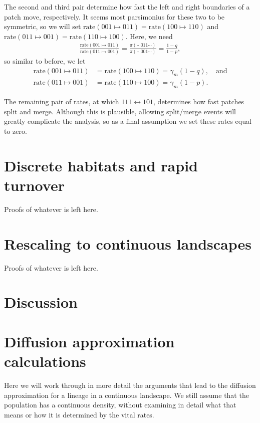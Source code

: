 \documentclass{article}
\newcommand{\rate}[2]{\text{rate}(#1\mapsto#2)}
\begin{document}
The second and third pair determine how fast the left and right boundaries of a patch move, respectively.
It seems most parsimonius for these two to be symmetric,
so we will set $\rate{001}{011} = \rate{100}{110}$ and $\rate{011}{001} = \rate{110}{100}$.
Here, we need
\begin{align*}
    \frac{\rate{001}{011}}{\rate{011}{001}}
    =
    \frac{\pi(\cdots011\cdots)}{\pi(\cdots001\cdots)}
    =
    \frac{1-q}{1-p} ,
\end{align*}
so similar to before, we let
\begin{align}
    \rate{001}{011} &= \rate{100}{110} = \gamma_m (1-q), \quad \text{and} \\
    \rate{011}{001} &= \rate{110}{100} = \gamma_m (1-p) .
\end{align}

The remaining pair of rates, at which $111 \leftrightarrow 101$,
determines how fast patches split and merge.
Although this is plausible, allowing split/merge events will greatly complicate the analysis,
so as a final assumption we set these rates equal to zero.




\section{Discrete habitats and rapid turnover}

Proofs of whatever is left here.


\section{Rescaling to continuous landscapes}

Proofs of whatever is left here.


\section{Discussion}



\appendix


\section{Diffusion approximation calculations}

Here we will work through in more detail the arguments that lead to the diffusion approximation
for a lineage in a continuous landscape.
We still assume that the population has a continuous density,
without examining in detail what that means or how it is determined by the vital rates.
\end{document}
